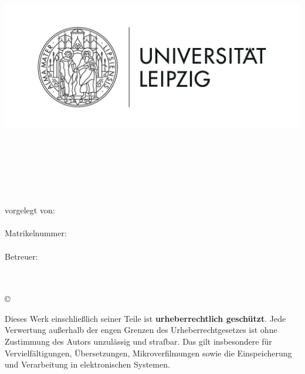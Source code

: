 \thispagestyle{plain}
\begin{titlepage}

  \begin{center}
    \includegraphics[height=7cm]{Bilder/Uni-L.png}\\[2.5ex]

    \institut\\
    \fakultaet\\
    \fachgebiet\\[6ex]

    \textbf{\large\titel}\\[1.5ex]
    \art\\[6ex]

    \normalsize
    vorgelegt von:\\
    \autor\\[1.5ex]
    Matrikelnummer:\\
    \matrikelnr\\[1.5ex]
    Betreuer:\\
    \erstbetreuer\\
    \zweitbetreuer\\[1.0ex]
  \end{center}


  \begin{center}
    \copyright\ \jahr\\[1.0ex]
  \end{center}

  \singlespacing
  \small
  \noindent Dieses Werk einschließlich seiner Teile ist \textbf{urheberrechtlich geschützt}. Jede Verwertung außerhalb der engen Grenzen des Urheberrechtgesetzes ist ohne Zustimmung des Autors unzulässig und strafbar. Das gilt insbesondere für Vervielfältigungen, Übersetzungen, Mikroverfilmungen sowie die Einspeicherung und Verarbeitung in elektronischen Systemen.

\end{titlepage}
